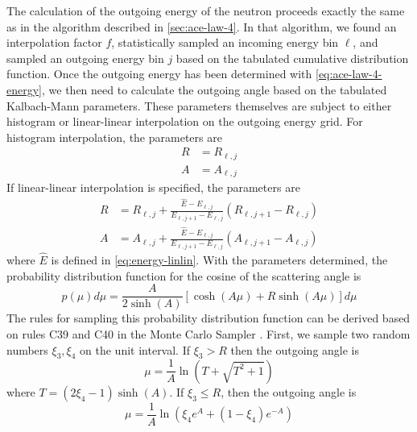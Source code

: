 The calculation of the outgoing energy of the neutron proceeds exactly the same
as in the algorithm described in \autoref{sec:ace-law-4}. In that algorithm, we
found an interpolation factor $f$, statistically sampled an incoming energy bin
$\ell$, and sampled an outgoing energy bin $j$ based on the tabulated cumulative
distribution function. Once the outgoing energy has been determined with
\eqref{eq:ace-law-4-energy}, we then need to calculate the outgoing angle based
on the tabulated Kalbach-Mann parameters. These parameters themselves are
subject to either histogram or linear-linear interpolation on the outgoing
energy grid. For histogram interpolation, the parameters are
\begin{equation}
  \label{eq:KM-parameters-histogram}
  \begin{split}
    R &= R_{\ell,j} \\ 
    A &= A_{\ell,j}
  \end{split}
\end{equation}
If linear-linear interpolation is specified, the parameters are
\begin{equation}
  \label{eq:KM-parameters-linlin}
  \begin{split}
    R &= R_{\ell,j} + \frac{\hat{E} - E_{\ell,j}}{E_{\ell,j+1} - E_{\ell,j}} (
    R_{\ell,j+1} - R_{\ell,j} ) \\
    A &= A_{\ell,j} + \frac{\hat{E} - E_{\ell,j}}{E_{\ell,j+1} - E_{\ell,j}} (
    A_{\ell,j+1} - A_{\ell,j} )
  \end{split}
\end{equation}
where $\hat{E}$ is defined in \eqref{eq:energy-linlin}. With the parameters
determined, the probability distribution function for the cosine of the
scattering angle is
\begin{equation}
  \label{eq:KM-pdf-angle}
  p(\mu) d\mu = \frac{A}{2 \sinh (A)} \left [ \cosh (A\mu) + R \sinh (A\mu)
    \right ] d\mu
\end{equation}
The rules for sampling this probability distribution function can be derived
based on rules C39 and C40 in the Monte Carlo Sampler
\cite{lanl-everett-1983}. First, we sample two random numbers $\xi_3, \xi_4$ on
the unit interval. If $\xi_3 > R$ then the outgoing angle is
\begin{equation}
  \label{eq:KM-angle-1}
  \mu = \frac{1}{A} \ln \left ( T + \sqrt{T^2 + 1} \right )
\end{equation}
where $T = (2 \xi_4 - 1) \sinh (A)$. If $\xi_3 \le R$, then the
outgoing angle is
\begin{equation}
  \label{eq:KM-angle-2}
  \mu = \frac{1}{A} \ln \left ( \xi_4 e^A + (1 - \xi_4) e^{-A} \right )
\end{equation}

